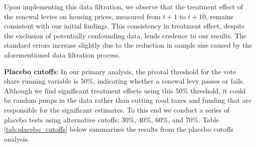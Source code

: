 Upon implementing this data filtration, we observe that the treatment effect of the renewal levies on housing prices, measured from $t+1$ to $t+10$, remains consistent with our initial findings. This consistency in treatment effect, despite the exclusion of potentially confounding data, lends credence to our results. The standard errors increase slightly due to the reduction in sample size caused by the aforementioned data filtration process. 

\textbf{Placebo cutoffs}: In our primary analysis, the pivotal threshold for the vote share running variable is 50\%, indicating whether a renewal levy passes or fails.  Although we find significant treatment effects using this 50\% threshold, it could be random jumps in the data rather than cutting road taxes and funding that are responsible for the significant estimates.  To this end we conduct a series of placebo tests using alternative cutoffs: 30\%, 40\%, 60\%, and 70\%. Table \ref{tab:placebo_cutoffs} below summarizes the results from the placebo cutoffs analysis. 

